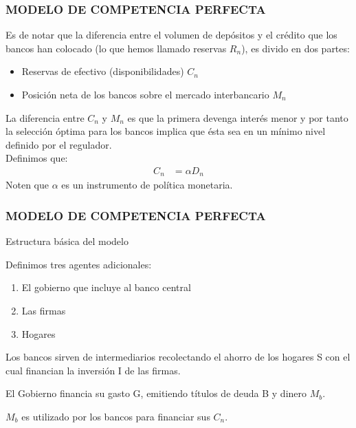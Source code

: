\documentclass[10pt, xcolor=table, x11names]{beamer}
\begin{document}
\begin{frame}\frametitle{{\normalsize MODELO DE COMPETENCIA PERFECTA} {}}
    
    Es de notar que la diferencia entre el volumen de depósitos y el crédito que los bancos han colocado (lo que hemos llamado reservas $R_{n}$), es divido en dos partes:
    \begin{itemize}
        \item Reservas de efectivo (disponibilidades) $C_{n}$
        \item Posición neta de los bancos sobre el mercado interbancario $M_{n}$
    \end{itemize}
    La diferencia entre $C_{n}$ y $M_{n}$ es que la primera devenga interés menor y por tanto la selección óptima para los bancos implica que ésta sea en un mínimo nivel definido por el regulador.\\
    Definimos que:
    \begin{align}
    C_{n}&=\alpha D_{n}\nonumber
    \end{align} 
    Noten que $\alpha$ es un instrumento de política monetaria.
    
    


            
\end{frame}


\begin{frame}\frametitle{{\normalsize MODELO DE COMPETENCIA PERFECTA} {}}

\begin{block} {Estructura básica del modelo}
\begin{description}
    \item[Supuesto 5] Definimos tres agentes adicionales:
    \begin{enumerate}
        \item El gobierno que incluye al banco central
        \item Las firmas
        \item Hogares
    \end{enumerate}  
    \item Los bancos sirven de intermediarios recolectando el ahorro de los hogares S con el cual financian la inversión I de las firmas.
    \item El Gobierno financia su gasto G, emitiendo títulos de deuda B y dinero $M_{b}$.
    \item $M_{b}$ es utilizado por los bancos para financiar sus $C_{n}$.
     
        
\end{description}

\end{block}	

\end{frame}
\end{document}
